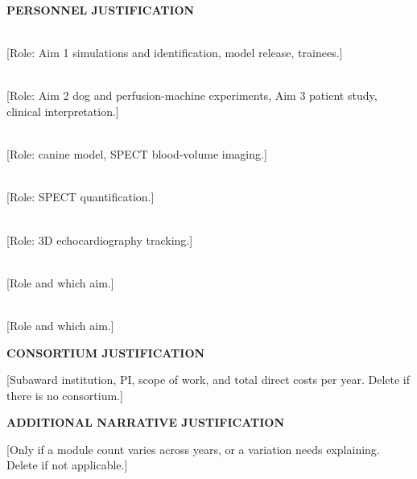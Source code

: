 \documentclass[11pt]{article}
\begin{document}
\textbf{PERSONNEL JUSTIFICATION}

\\
{}[Role: Aim 1 simulations and identification, model release, trainees.]

\\
{}[Role: Aim 2 dog and perfusion-machine experiments, Aim 3 patient study, clinical interpretation.]

\\
{}[Role: canine model, SPECT blood-volume imaging.]

\\
{}[Role: SPECT quantification.]

\\
{}[Role: 3D echocardiography tracking.]

\\
{}[Role and which aim.]

\\
{}[Role and which aim.]

\bigskip
\textbf{CONSORTIUM JUSTIFICATION}

[Subaward institution, PI, scope of work, and total direct costs per year.
Delete if there is no consortium.]

\bigskip
\textbf{ADDITIONAL NARRATIVE JUSTIFICATION}

[Only if a module count varies across years, or a variation needs explaining.
Delete if not applicable.]
\end{document}
